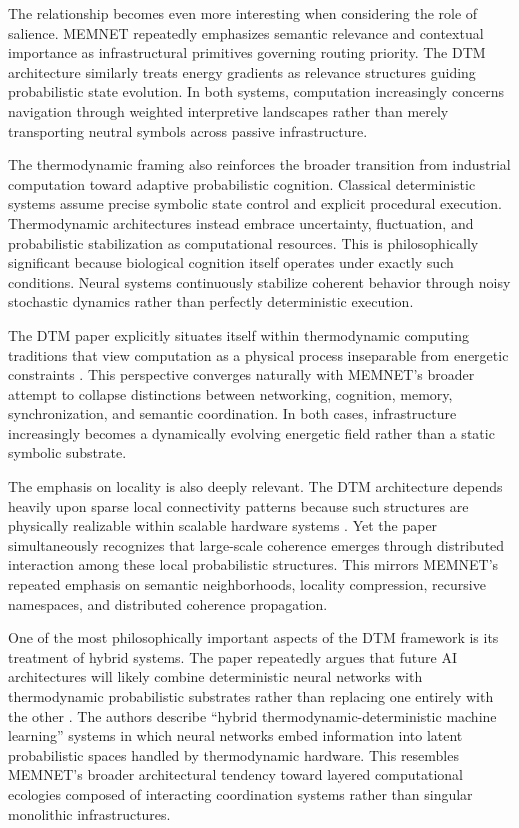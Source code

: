 \documentclass[11pt,a4paper]{article}
\begin{document}
The relationship becomes even more interesting when considering the role of salience. MEMNET repeatedly emphasizes semantic relevance and contextual importance as infrastructural primitives governing routing priority. The DTM architecture similarly treats energy gradients as relevance structures guiding probabilistic state evolution. In both systems, computation increasingly concerns navigation through weighted interpretive landscapes rather than merely transporting neutral symbols across passive infrastructure.

The thermodynamic framing also reinforces the broader transition from industrial computation toward adaptive probabilistic cognition. Classical deterministic systems assume precise symbolic state control and explicit procedural execution. Thermodynamic architectures instead embrace uncertainty, fluctuation, and probabilistic stabilization as computational resources. This is philosophically significant because biological cognition itself operates under exactly such conditions. Neural systems continuously stabilize coherent behavior through noisy stochastic dynamics rather than perfectly deterministic execution.

The DTM paper explicitly situates itself within thermodynamic computing traditions that view computation as a physical process inseparable from energetic constraints \cite{jelincic2025}. This perspective converges naturally with MEMNET's broader attempt to collapse distinctions between networking, cognition, memory, synchronization, and semantic coordination. In both cases, infrastructure increasingly becomes a dynamically evolving energetic field rather than a static symbolic substrate.

The emphasis on locality is also deeply relevant. The DTM architecture depends heavily upon sparse local connectivity patterns because such structures are physically realizable within scalable hardware systems \cite{jelincic2025}. Yet the paper simultaneously recognizes that large-scale coherence emerges through distributed interaction among these local probabilistic structures. This mirrors MEMNET's repeated emphasis on semantic neighborhoods, locality compression, recursive namespaces, and distributed coherence propagation.

One of the most philosophically important aspects of the DTM framework is its treatment of hybrid systems. The paper repeatedly argues that future AI architectures will likely combine deterministic neural networks with thermodynamic probabilistic substrates rather than replacing one entirely with the other \cite{jelincic2025}. The authors describe ``hybrid thermodynamic-deterministic machine learning'' systems in which neural networks embed information into latent probabilistic spaces handled by thermodynamic hardware. This resembles MEMNET's broader architectural tendency toward layered computational ecologies composed of interacting coordination systems rather than singular monolithic infrastructures.
\end{document}
